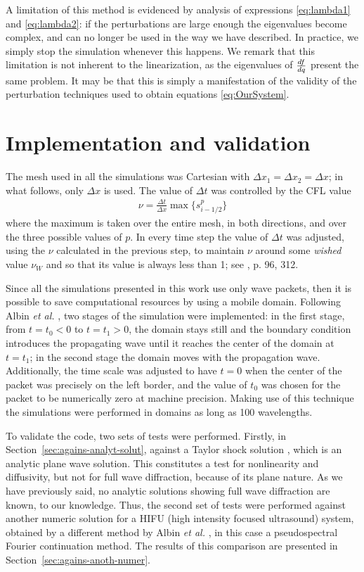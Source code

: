 A limitation of this method is evidenced by analysis of expressions \eqref{eq:lambda1} and \eqref{eq:lambda2}: 
if the perturbations are large enough the eigenvalues become complex, and can no longer be used in the way we have described. 
In practice, we simply stop the simulation whenever this happens. 
We remark that this limitation is not inherent to the linearization, as the eigenvalues of $\frac{d f}{d q}$ present the same problem. 
It may be that this is simply a manifestation of the validity of the perturbation techniques used to obtain equations \eqref{eq:OurSystem}.

\section{Implementation and validation}
\label{sec:results}

The mesh used in all the simulations was Cartesian with $\Delta x_1 = \Delta x_2 = \Delta x$; 
in what follows, only $\Delta x$ is used. 
The value of $\Delta t$ was controlled by the CFL value
\begin{align*}
  \nu = \frac{\Delta t}{\Delta x} \max\{s_{i-1/2}^p\} 
\end{align*}
where the maximum is taken over the entire mesh, in both directions, and over the three possible values of $p$. 
In every time step the value of $\Delta t$ was adjusted, using the $\nu$ calculated in the previous step, to maintain $\nu$ around some {\em wished} value $\nu_W$ and so that its value is always less than 1; see \citep{leveque-book-fv}, p. 96, 312.

Since all the simulations presented in this work use only wave packets, then it is possible to save computational resources by using a mobile domain. 
Following Albin {\em et al.} \citep{albin}, two stages of the simulation were implemented:
in the first stage, from $t=t_0<0$ to $t=t_1>0$, the domain stays still and the boundary condition introduces the propagating wave until it reaches the center of the domain at $t=t_1$; 
in the second stage the domain moves with the propagation wave. 
Additionally, the time scale was adjusted to have $t=0$ when the center of the packet was precisely on the left border, and the value of $t_0$ was chosen for the packet to be numerically zero at  machine precision. 
Making use of this technique the simulations were performed in domains as long as 100 wavelengths.

To validate the code, two sets of tests were performed. 
Firstly, in Section~\ref{sec:agains-analyt-solut}, against a Taylor shock solution \citep{jordan}, which is an analytic plane wave solution. 
This  constitutes a test for nonlinearity and diffusivity, but not for full wave diffraction, because of its plane nature. 
As we have previously said, no analytic solutions showing full wave diffraction are known, to our knowledge. 
Thus, the second set of tests were performed against another numeric solution for a HIFU (high intensity focused ultrasound) system, obtained by a different method by Albin {\em et al.} \citep{albin}, in this case a pseudospectral Fourier continuation method.
The results of this comparison are presented in Section~\ref{sec:agains-anoth-numer}.

